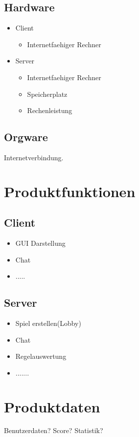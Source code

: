 \documentclass{article}
\begin{document}
\subsection{Hardware}
\begin{itemize}
		\item Client
		\begin{itemize}
			\item Internetfaehiger Rechner
		\end{itemize}
		\item Server
		\begin{itemize}
			\item Internetfaehiger Rechner	
			\item Speicherplatz
			\item Rechenleistung
		\end{itemize}
	\end{itemize}

\subsection{Orgware}
Internetverbindung.

\section{Produktfunktionen}
\subsection{Client}
\begin{itemize}
	\item GUI Darstellung
	\item Chat
	\item .....
\end{itemize}

\subsection{Server}
\begin{itemize}
	\item Spiel erstellen(Lobby)
	\item Chat
	\item Regelauswertung
	\item .......
\end{itemize}

\section{Produktdaten}
Benutzerdaten?
Score?
Statistik?
\end{document}
